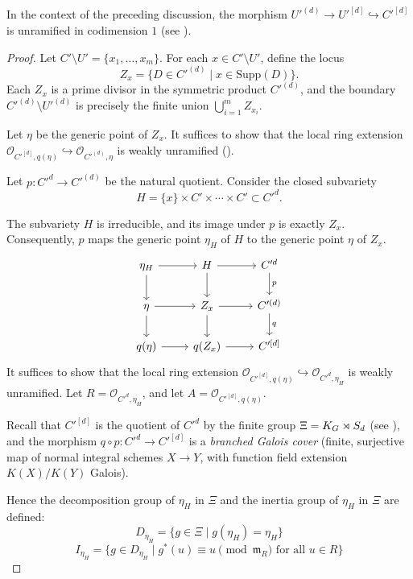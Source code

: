 \begin{lemma}\label{lemma:torsor_unramified_codim_one}
In the context of the preceding discussion, the morphism $U'^{(d)} \to U'^{[d]} \hookrightarrow C'^{[d]}$
is unramified in codimension $1$ (see ).
\end{lemma}
\begin{proof}

Let $C' \setminus U' = \{x_1, \ldots, x_m \}$. For each $x \in C' \setminus U'$, define the locus
$$Z_x = \{D \in C'^{(d)} \mid x \in \mathrm{Supp}(D) \}.$$
Each $Z_x$ is a prime divisor in the symmetric product $C'^{(d)}$, and the boundary $C'^{(d)} \setminus U'^{(d)}$ is precisely the finite union $\bigcup_{i=1}^m Z_{x_i}$.

Let $\eta$ be the generic point of $Z_x$.
It suffices to show that the local ring extension $\mathcal{O}_{C'^{[d]}, q(\eta)} \hookrightarrow \mathcal{O}_{C'^{(d)}, \eta}$ is weakly unramified ().

Let $p: C'^d \to C'^{(d)}$ be the natural quotient. Consider the closed subvariety
$$H = \{x\} \times C' \times \cdots \times C' \subset C'^d.$$

The subvariety $H$ is irreducible, and its image under $p$ is exactly $Z_x$.
Consequently, $p$ maps the generic point $\eta_H$ of $H$ to the generic point $\eta$ of $Z_x$.
\[
\begin{tikzcd}
\eta_H \arrow[d] \arrow[r] & H \arrow[r] \arrow[d] & C'^d \arrow[d, "p"] \\
\eta \arrow[r] \arrow[d] & Z_x \arrow[r] \arrow[d] & C'^{(d)} \arrow[d, "q"] \\
q(\eta) \arrow[r] & q(Z_x) \arrow[r] & C'^{[d]}
\end{tikzcd}
\]
It suffices to show that the local ring extension $\mathcal{O}_{C'^{[d]}, q(\eta)} \hookrightarrow \mathcal{O}_{C'^d, \eta_H}$ is weakly unramified.
Let $R = \mathcal{O}_{C'^d, \eta_H}$, and let $A=\mathcal{O}_{C'^{[d]}, q(\eta)}$.

Recall that $C'^{[d]}$ is the quotient of $C'^d$ by the finite group $\Xi = K_{G} \rtimes S_d$ (see ),
and the morphism $q \circ p : C'^d \to C'^{[d]}$ is a \textit{branched Galois cover} (finite, surjective map of normal integral schemes $X \to Y$, with function field extension $K(X)/K(Y)$ Galois).

Hence the decomposition group of $\eta_H$ in $\Xi$ and the inertia group of $\eta_H$ in $\Xi$ are defined:
$$D_{\eta_H} = \{ g \in \Xi \mid g(\eta_H) = \eta_H \}$$
$$I_{\eta_H} = \{ g \in D_{\eta_H} \mid g^*(u) \equiv u \pmod{\mathfrak{m}_{R}} \text{ for all } u \in R \}$$


\end{proof}
